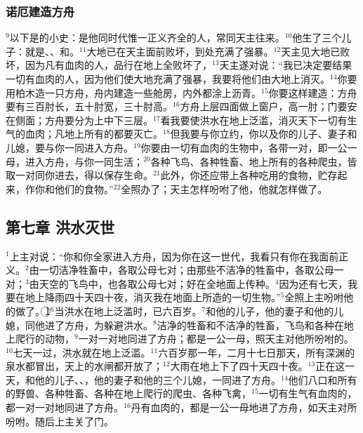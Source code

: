 \subsubsection{诺厄建造方舟}
$^{9}$以下是\UL[诺厄]的小史：\UL[诺厄]是他同时代惟一正义齐全的人，常同天主往来。$^{10}$他生了三个儿子：就是\UL[闪]、\UL[含]、和\UL[耶斐特]。$^{11}$大地已在天主面前败坏，到处充满了强暴。$^{12}$天主见大地已败坏，因为凡有血肉的人，品行在地上全败坏了，$^{13}$天主遂对\UL[诺厄]说：“我已决定要结果一切有血肉的人，因为他们使大地充满了强暴，我要将他们由大地上消灭。$^{14}$你要用柏木造一只方舟，舟内建造一些舱房，内外都涂上沥青。$^{15}$你要这样建造：方舟要有三百肘长，五十肘宽，三十肘高。$^{16}$方舟上层四面做上窗户，高一肘；门要安在侧面；方舟要分为上中下三层。$^{17}$看我要使洪水在地上泛滥，消灭天下一切有生气的血肉；凡地上所有的都要灭亡。$^{18}$但我要与你立约，你以及你的儿子、妻子和儿媳，要与你一同进入方舟。$^{19}$你要由一切有血肉的生物中，各带一对，即一公一母，进入方舟，与你一同生活；$^{20}$各种飞鸟、各种牲畜、地上所有的各种爬虫，皆取一对同你进去，得以保存生命。$^{21}$此外，你还应带上各种吃用的食物，贮存起来，作你和他们的食物。”$^{22}$\UL[诺厄]全照办了；天主怎样吩咐了他，他就怎样做了。


\subsection{第七章 洪水灭世}
$^{1}$上主对\UL[诺厄]说：“你和你全家进入方舟，因为你在这一世代，我看只有你在我面前正义。$^{2}$由一切洁净牲畜中，各取公母七对；由那些不洁净的牲畜中，各取公母一对；$^{3}$由天空的飞鸟中，也各取公母七对；好在全地面上传种。$^{4}$因为还有七天，我要在地上降雨四十天四十夜，消灭我在地面上所造的一切生物。”$^{5}$\UL[诺厄]全照上主吩咐他的做了。\textcircled{1}$^{6}$当洪水在地上泛滥时，\UL[诺厄]已六百岁。$^{7}$\UL[诺厄]和他的儿子，他的妻子和他的儿媳，同他进了方舟，为躲避洪水。$^{8}$洁净的牲畜和不洁净的牲畜，飞鸟和各种在地上爬行的动物，$^{9}$一对一对地同\UL[诺厄]进了方舟；都是一公一母，照天主对他所吩咐的。$^{10}$七天一过，洪水就在地上泛滥。$^{11}$\UL[诺厄]六百岁那一年，二月十七日那天，所有深渊的泉水都冒出，天上的水闸都开放了；$^{12}$大雨在地上下了四十天四十夜。$^{13}$正在这一天，\UL[诺厄]和他的儿子\UL[闪]、\UL[含]、\UL[耶斐特]，他的妻子和他的三个儿媳，一同进了方舟。$^{14}$他们八口和所有的野兽、各种牲畜、各种在地上爬行的爬虫、各种飞禽，$^{15}$一切有生气有血肉的，都一对一对地同\UL[诺厄]进了方舟。$^{16}$丹有血肉的，都是一公一母地进了方舟，如天主对\UL[诺厄]所吩咐。随后上主关了门。

